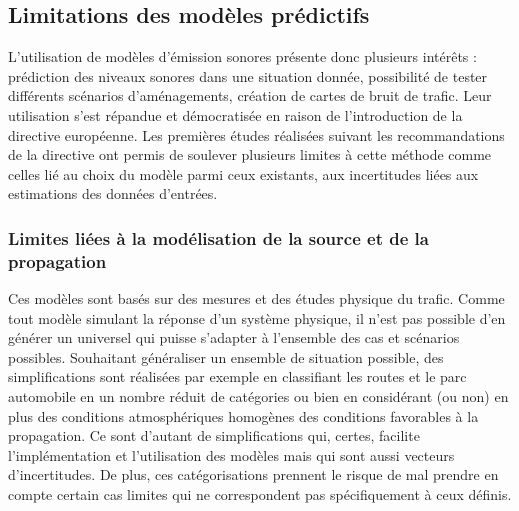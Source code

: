 

\subsection{Limitations des modèles prédictifs}

L'utilisation de modèles d'émission sonores présente donc plusieurs intérêts : prédiction des niveaux sonores dans une situation donnée, possibilité de tester différents scénarios d'aménagements, création de cartes de bruit de trafic. Leur utilisation s'est répandue et démocratisée en raison de l'introduction de la directive européenne. Les premières études réalisées suivant les recommandations de la directive ont permis de soulever plusieurs limites à cette méthode comme celles lié au choix du modèle parmi ceux existants, aux incertitudes liées aux estimations des données d'entrées.

\subsubsection{Limites liées à la modélisation de la source et de la propagation}

Ces modèles sont basés sur des mesures et des études physique du trafic. Comme tout modèle simulant la réponse d'un système physique, il n'est pas possible d'en générer un universel qui puisse s'adapter à l'ensemble des cas et scénarios possibles. Souhaitant généraliser un ensemble de situation possible, des simplifications sont réalisées par exemple en classifiant les routes et le parc automobile en un nombre réduit de catégories ou bien en considérant (ou non) en plus des conditions atmosphériques homogènes des conditions favorables à la propagation. Ce sont d'autant de simplifications qui, certes, facilite l'implémentation et l'utilisation des modèles mais qui sont aussi vecteurs d'incertitudes. De plus, ces catégorisations prennent le risque de mal prendre en compte certain cas limites qui ne correspondent pas spécifiquement à ceux définis.

